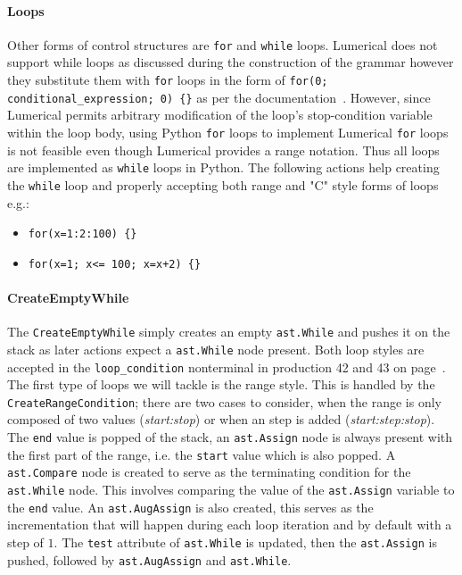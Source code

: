 \paragraph{Loops}
Other forms of control structures are \texttt{for} and \texttt{while} loops. Lumerical does not support while loops as discussed during the construction of the grammar however they substitute them with \texttt{for} loops in the form of \texttt{for(0; conditional\_expression; 0) \{\}} as per the documentation~\cite{ansys_for_command}. However, since Lumerical permits arbitrary modification of the loop's stop-condition variable within the loop body, using Python \texttt{for} loops to implement Lumerical \texttt{for} loops is not feasible even though Lumerical provides a range notation. Thus all loops are implemented as \texttt{while} loops in Python. The following actions help creating the \texttt{while} loop and properly accepting both range and "C" style forms of loops e.g.:
\begin{itemize}
  \item  \texttt{for(x=1:2:100) \{\}}
  \item  \texttt{for(x=1; x<= 100; x=x+2) \{\}}
\end{itemize}

\paragraph{CreateEmptyWhile}
The \texttt{CreateEmptyWhile} simply creates an empty \texttt{ast.While} and pushes it on the stack as later actions expect a \texttt{ast.While} node present. Both loop styles are accepted in the \texttt{loop\_condition} nonterminal in production 42 and 43 on page~\pageref{tab:commands4}. The first type of loops we will tackle is the range style. This is handled by the \texttt{CreateRangeCondition}; there are two cases to consider, when the range is only composed of two values (\emph{start:stop}) or when an step is added (\emph{start:step:stop}). The \texttt{end} value is popped of the stack, an \texttt{ast.Assign} node is always present with the first part of the range, i.e. the \texttt{start} value which is also popped. A \texttt{ast.Compare} node is created to serve as the terminating condition for the \texttt{ast.While} node. This involves comparing the value of the \texttt{ast.Assign} variable to the \texttt{end} value. An \texttt{ast.AugAssign} is also created, this serves as the incrementation that will happen during each loop iteration and by default with a step of $1$. The \texttt{test} attribute of \texttt{ast.While} is updated, then the \texttt{ast.Assign} is pushed, followed by \texttt{ast.AugAssign} and \texttt{ast.While}.

